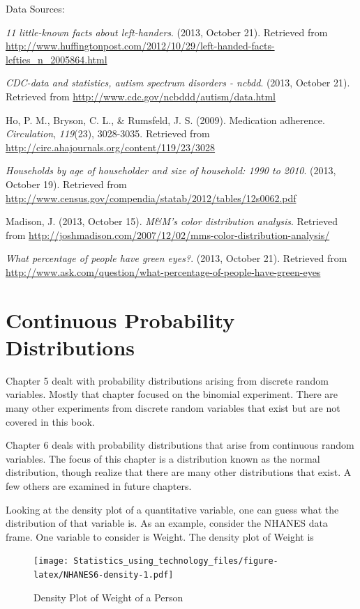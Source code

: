 \documentclass[
]{book}
\begin{document}
Data Sources:

\emph{11 little-known facts about left-handers}. (2013, October 21).
Retrieved from
\url{http://www.huffingtonpost.com/2012/10/29/left-handed-facts-lefties_n_2005864.html}

\emph{CDC-data and statistics, autism spectrum disorders - ncbdd}. (2013,
October 21). Retrieved from \url{http://www.cdc.gov/ncbddd/autism/data.html}

Ho, P. M., Bryson, C. L., \& Rumsfeld, J. S. (2009). Medication
adherence. \emph{Circulation}, \emph{119}(23), 3028-3035. Retrieved from
\url{http://circ.ahajournals.org/content/119/23/3028}

\emph{Households by age of householder and size of household: 1990 to 2010}.
(2013, October 19). Retrieved from
\url{http://www.census.gov/compendia/statab/2012/tables/12s0062.pdf}

Madison, J. (2013, October 15). \emph{M\&M's color distribution analysis}.
Retrieved from
\url{http://joshmadison.com/2007/12/02/mms-color-distribution-analysis/}

\emph{What percentage of people have green eyes?}. (2013, October 21).
Retrieved from
\url{http://www.ask.com/question/what-percentage-of-people-have-green-eyes}

\hypertarget{continuous-probability-distributions}{%
\chapter{Continuous Probability Distributions}\label{continuous-probability-distributions}}

Chapter 5 dealt with probability distributions arising from discrete random variables. Mostly that chapter focused on the binomial experiment. There are many other experiments from discrete random variables that exist but are not covered in this book.

Chapter 6 deals with probability distributions that arise from continuous random variables. The focus of this chapter is a distribution known as the normal distribution, though realize that there are many other distributions that exist. A few others are examined in future chapters.

Looking at the density plot of a quantitative variable, one can guess what the distribution of that variable is. As an example, consider the NHANES data frame. One variable to consider is Weight. The density plot of Weight is



\begin{figure}
\centering
\texttt{[image: Statistics\_using\_technology\_files/figure-latex/NHANES6-density-1.pdf]}
\caption{\label{fig:NHANES6-density}Density Plot of Weight of a Person}
\end{figure}
\end{document}
